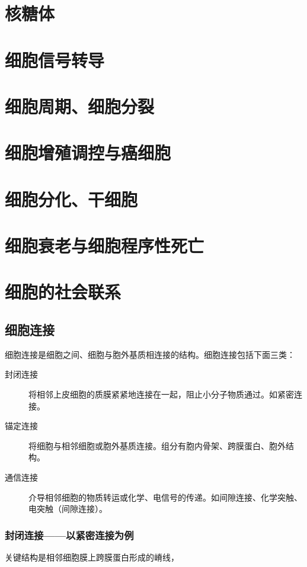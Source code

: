 \section{核糖体}

\section{细胞信号转导}

\section{细胞周期、细胞分裂}

\section{细胞增殖调控与癌细胞}





\section{细胞分化、干细胞}

\section{细胞衰老与细胞程序性死亡}

\section{细胞的社会联系}

\subsection{细胞连接}

细胞连接是细胞之间、细胞与胞外基质相连接的结构。细胞连接包括下面三类：

\begin{description}
	\item[封闭连接] 将相邻上皮细胞的质膜紧紧地连接在一起，阻止小分子物质通过。如紧密连接。
	\item[锚定连接] 将细胞与相邻细胞或胞外基质连接。组分有胞内骨架、跨膜蛋白、胞外结构。
	\item[通信连接] 介导相邻细胞的物质转运或化学、电信号的传递。如间隙连接、化学突触、电突触（间隙连接）。
\end{description}

\subsubsection{封闭连接——以紧密连接为例}

关键结构是相邻细胞膜上跨膜蛋白形成的嵴线，

